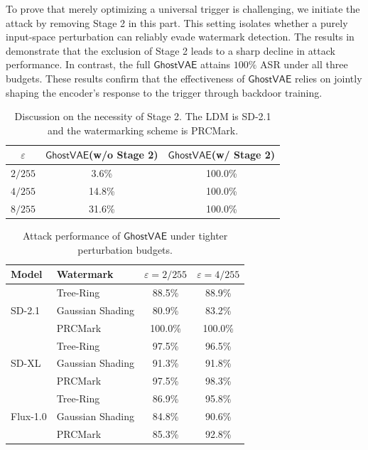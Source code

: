 \documentclass[letterpaper,twocolumn,10pt]{article}
\newcommand{\mg}{$\mathsf{GhostVAE}$\xspace}
\newcommand{\mypara}[1]{\smallskip\noindent{\bf {#1}.} \xspace}
\begin{document}
\mypara{The Necessity of Stage 2}
To prove that merely optimizing a universal trigger is challenging, we initiate the attack by removing Stage 2 in this part.
This setting isolates whether a purely input-space perturbation can reliably evade watermark detection.
The results in  demonstrate that the exclusion of Stage 2 leads to a sharp decline in attack performance.
In contrast, the full \mg attains $100\%$ ASR under all three budgets. 
These results confirm that the effectiveness of \mg relies on jointly shaping the encoder’s response to the trigger through backdoor training.
\begin{table}[t]
\centering
\caption{Discussion on the necessity of Stage 2.
The LDM is SD-2.1 and the watermarking scheme is PRCMark.}
\label{tab:noise_only_ablation}
\setlength{\tabcolsep}{3.5pt}
\begin{tabular}{c cc}
\toprule
$\varepsilon$ & \mg (w/o Stage 2) & \mg (w/ Stage 2) \\
\midrule
$2/255$ & 3.6\% & 100.0\% \\
$4/255$ & 14.8\% & 100.0\% \\
$8/255$ & 31.6\% & 100.0\% \\
\bottomrule
\end{tabular}
\end{table}

\begin{table}[t]
\centering
\caption{Attack performance of \mg under tighter perturbation budgets.}
\label{tab:attack_results_asr_ablation_eps}
\setlength{\tabcolsep}{5pt}
\begin{tabular}{ll cc}
\toprule
Model & Watermark & $\varepsilon=2/255$ & $\varepsilon=4/255$ \\
\midrule
\multirow{3}{*}{SD-2.1}
& Tree-Ring & 88.5\% & 88.9\% \\
& Gaussian Shading      & 80.9\% & 83.2\% \\
& PRCMark     & 100.0\%  & 100.0\%  \\
\midrule
\multirow{3}{*}{SD-XL}
& Tree-Ring & 97.5\% & 96.5\% \\
& Gaussian Shading      & 91.3\% & 91.8\% \\
& PRCMark     & 97.5\% & 98.3\% \\
\midrule
\multirow{3}{*}{Flux-1.0}
& Tree-Ring & 86.9\% & 95.8\% \\
& Gaussian Shading      & 84.8\% & 90.6\% \\
& PRCMark     & 85.3\% & 92.8\% \\
\bottomrule
\end{tabular}
\end{table}
\end{document}
